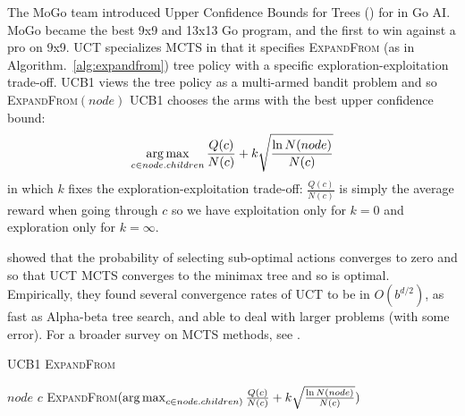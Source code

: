 The MoGo team \citep{GellyUCT, Gelly2006} introduced Upper Confidence Bounds for Trees () for  in Go AI. MoGo became the best 9x9 and 13x13 Go program, and the first to win against a pro on 9x9. UCT specializes MCTS in that it specifies \textsc{ExpandFrom} (as in Algorithm.~\ref{alg:expandfrom}) tree policy with a specific exploration-exploitation trade-off. UCB1 \citep{BanditBased} views the tree policy as a multi-armed bandit problem and so \textsc{ExpandFrom}$(node)$ UCB1 chooses the arms with the best upper confidence bound: $$\operatorname*{arg\,max}_{c \in node.children} \frac{Q(c)}{N(c)}+k\sqrt{\frac{\ln N(node)}{N(c)}}$$ in which $k$ fixes the exploration-exploitation trade-off: $\frac{Q(c)}{N(c)}$ is simply the average reward when going through $c$ so we have exploitation only for $k=0$ and exploration only for $k=\infty$.

\citet{BanditBased} showed that the probability of selecting sub-optimal actions converges to zero and so that UCT MCTS converges to the minimax tree and so is optimal. Empirically, they found several convergence rates of UCT to be in $O(b^{d/2})$, as fast as Alpha-beta tree search, and able to deal with larger problems (with some error). For a broader survey on MCTS methods, see \citep{MCTSsurvey}.

\begin{algorithm}
\caption{UCB1 \textsc{ExpandFrom}}
\label{alg:expandfrom}
\begin{algorithmic}
        \State \Return $node$ 
    \EndIf
        \State \Return $c$ 
    \EndIf
    \State \Return \textsc{ExpandFrom}$(\operatorname*{arg\,max}_{c \in node.children)} \frac{Q(c)}{N(c)}+k\sqrt{\frac{\ln N(node)}{N(c)}})$ 
\EndFunction 
\end{algorithmic}
\end{algorithm}

